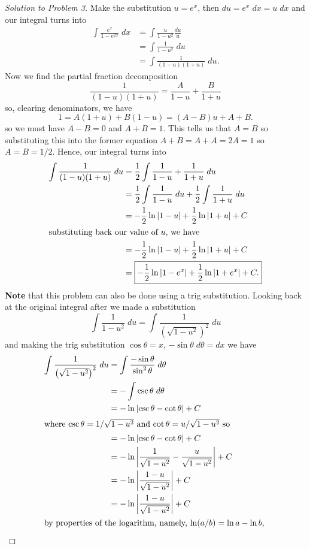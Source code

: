 \documentclass[12pt]{article}
\theoremstyle{plain}
\theoremstyle{definition}
\theoremstyle{remark}
\begin{document}
\begin{proof}[Solution to Problem 3]
Make the substitution $u=e^x$, then $du=e^x\;dx=u\;dx$ and our integral
turns into
\begin{align*}
\int\frac{e^x}{1-e^{2x}}\;dx
&=\int\frac{u}{1-u^2}\frac{du}{u}\\
&=\int\frac{1}{1-u^2}\;du\\
&=\int\frac{1}{(1-u)(1+u)}\;du.
\end{align*}
Now we find the partial fraction decomposition
\[
\frac{1}{(1-u)(1+u)}=\frac{A}{1-u}+\frac{B}{1+u}
\]
so, clearing denominators, we have
\[
1=A(1+u)+B(1-u)=(A-B)u+A+B.
\]
so we must have $A-B=0$ and $A+B=1$. This tells us that $A=B$ so
substituting this into the former equation $A+B=A+A=2A=1$ so
$A=B=1/2$. Hence, our integral turns into
\begin{align*}
\int\frac{1}{(1-u)(1+u)}\;du
&=\frac{1}{2}\int\frac{1}{1-u}+\frac{1}{1+u}\;du\\
&=\frac{1}{2}\int\frac{1}{1-u}\;du
+\frac{1}{2}\int\frac{1}{1+u}\;du\\
&=-\frac{1}{2}\ln|1-u|+\frac{1}{2}\ln|1+u|+C\\
\intertext{substituting back our value of $u$, we have}
&=-\frac{1}{2}\ln|1-u|+\frac{1}{2}\ln|1+u|+C\\
&=\boxed{
-\frac{1}{2}\ln\left|1-e^x\right|
+\frac{1}{2}\ln\left|1+e^x\right|+C.}
\end{align*}
\textbf{Note} that this problem can also be done using a trig
substitution. Looking back at the original integral after we made a
substitution
\[
\int\frac{1}{1-u^2}\;du
=\int\frac{1}{\left(\sqrt{1-u^2}\right)^2}\;du
\]
and making the trig substitution $\cos\theta=x$, $-\sin\theta\;d\theta=dx$
we have
\begin{align*}
\int\frac{1}{\left(\sqrt{1-u^2}\right)^2}\;du
&=\int\frac{-\sin\theta}{\sin^2\theta}\;d\theta\\
&=-\int\csc\theta\;d\theta\\
&=-\ln\left|\csc\theta-\cot\theta\right|+C\\
\intertext{where $\csc\theta=1/\sqrt{1-u^2}$ and
  $\cot\theta=u/\sqrt{1-u^2}$ so}
&=-\ln\left|\csc\theta-\cot\theta\right|+C\\
&=-\ln\left|\frac{1}{\sqrt{1-u^2}}-\frac{u}{\sqrt{1-u^2}}\right|+C\\
&=-\ln\left|\frac{1-u}{\sqrt{1-u^2}}\right|+C\\
&=-\ln\left|\frac{1-u}{\sqrt{1-u^2}}\right|+C\\
\intertext{by properties of the logarithm, namely, $\ln(a/b)=\ln a-\ln b$,
}
\end{align*}
\end{proof}
\end{document}
